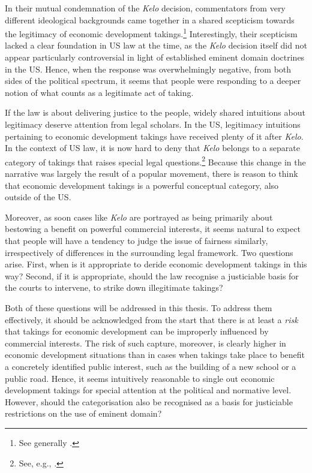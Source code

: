 In their mutual condemnation of the {\it Kelo} decision, commentators from very different ideological backgrounds came together in a shared scepticism towards the legitimacy of economic development takings.\footnote{See generally \cite{somin08}.} Interestingly, their scepticism lacked a clear foundation in US law at the time, as the {\it Kelo} decision itself did not appear particularly controversial in light of established eminent domain doctrines in the US. Hence, when the response was overwhelmingly negative, from both sides of the political spectrum, it seems that people were responding to a deeper notion of what counts as a legitimate act of taking.


If the law is about delivering justice to the people, widely shared intuitions about legitimacy deserve attention from legal scholars. In the US, legitimacy intuitions pertaining to economic development takings have received plenty of it after {\it Kelo}. In the context of US law, it is now hard to deny that {\it Kelo} belongs to a separate category of takings that raises special legal questions.\footnote{See, e.g., \cite{cohen06,somin07}.} Because this change in the narrative was largely the result of a popular movement, there is reason to think that economic development takings is a powerful conceptual category, also outside of the US. 

Moreover, as soon cases like {\it Kelo} are portrayed as being primarily about bestowing a benefit on powerful commercial interests, it seems natural to expect that people will have a tendency to judge the issue of fairness similarly, irrespectively of differences in the surrounding legal framework. Two questions arise. First, when is it appropriate to deride economic development takings in this way? Second, if it is appropriate, should the law recognise a justiciable basis for the courts to intervene, to strike down illegitimate takings?

Both of these questions will be addressed in this thesis. To address them effectively, it should be acknowledged from the start that there is at least a {\it risk} that takings for economic development can be improperly influenced by commercial interests. The risk of such capture, moreover, is clearly higher in economic development situations than in cases when takings take place to benefit a concretely identified public interest, such as the building of a new school or a public road. Hence, it seems intuitively reasonable to single out economic development takings for special attention at the political and normative level. However, should the categorisation also be recognised as a basis for justiciable restrictions on the use of eminent domain?

